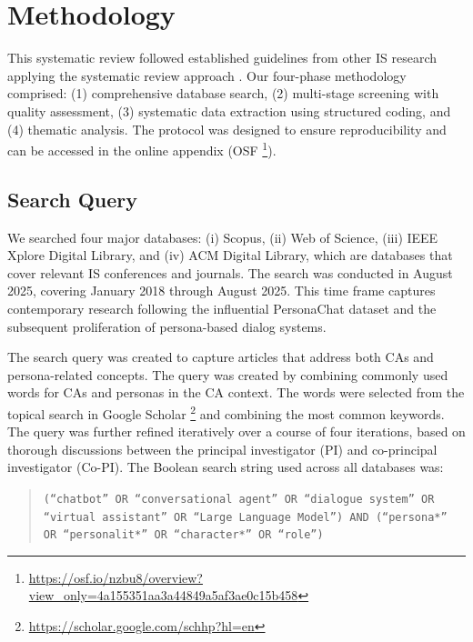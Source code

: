 \documentclass[manuscript,anonymous,sigconf]{acmart}
\begin{document}
\section{Methodology}

This systematic review followed established guidelines from other IS research applying the systematic review approach \citep{collins2021artificial,hummel2014state,epizitone2023systematic}. Our four-phase methodology comprised: (1) comprehensive database search, (2) multi-stage screening with quality assessment, (3) systematic data extraction using structured coding, and (4) thematic analysis. The protocol was designed to ensure reproducibility and can be accessed in the online appendix (OSF \footnote{\href{https://osf.io/nzbu8/overview?view_only=4a155351aa3a44849a5af3ae0c15b458}{https://osf.io/nzbu8/overview?view\_only=4a155351aa3a44849a5af3ae0c15b458}}).

\subsection{Search Query}

We searched four major databases: (i) Scopus, (ii) Web of Science, (iii) IEEE Xplore Digital Library, and (iv) ACM Digital Library, which are databases that cover relevant IS conferences and journals. The search was conducted in August 2025, covering January 2018 through August 2025. This time frame captures contemporary research following the influential PersonaChat dataset \citep{zhang2018personalizing} and the subsequent proliferation of persona-based dialog systems.

The search query was created to capture articles that address both CAs and persona-related concepts. The query was created by combining commonly used words for CAs and personas in the CA context. The words were selected from the topical search in Google Scholar \footnote{\url{https://scholar.google.com/schhp?hl=en}} and combining the most common keywords. The query was further refined iteratively over a course of four iterations, based on thorough discussions between the principal investigator (PI) and co-principal investigator (Co-PI). %
The Boolean search string used across all databases was:

\begin{quote}
\texttt{(``chatbot'' OR ``conversational agent'' OR ``dialogue system'' OR ``virtual assistant'' OR ``Large Language Model'') AND (``persona*'' OR ``personalit*'' OR ``character*'' OR ``role'')}
\end{quote}
\end{document}

